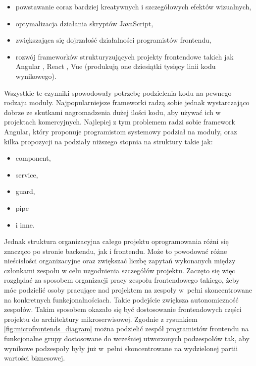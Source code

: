 \documentclass{SGGW-thesis}
\begin{document}
\begin{itemize}
	\item powstawanie coraz bardziej kreatywnych i szczegółowych efektów wizualnych,
	\item optymalizacja działania skryptów JavaScript,
	\item zwiększająca się dojrzałość działalności programistów frontendu,
	\item rozwój frameworków strukturyzujących projekty frontendowe takich jak Angular \cite{angular}, React \cite{react}, Vue \cite{vue} (produkują one dziesiątki tysięcy linii kodu wynikowego).
\end{itemize}

Wszystkie te czynniki spowodowały potrzebę podzielenia kodu na pewnego rodzaju moduły. Najpopularniejsze frameworki radzą sobie jednak wystarczająco dobrze ze skutkami nagromadzenia dużej ilości kodu, aby używać ich w projektach komercyjnych. Najlepiej z tym problemem radzi sobie framework Angular, który proponuje programistom systemowy podział na moduły, oraz kilka propozycji na podziały niższego stopnia na struktury takie jak:

\begin{itemize}
	\item component,
	\item service,
	\item guard,
	\item pipe
	\item i inne.
\end{itemize}

Jednak struktura organizacyjna całego projektu oprogramowania różni się znacząco po stronie backendu, jak i frontendu. Może to powodować różne nieścisłości organizacyjne oraz zwiększać liczbę zapytań wykonanych między członkami zespołu w celu uzgodnienia szczegółów projektu. Zaczęto się więc rozglądać za sposobem organizacji pracy zespołu frontendowego takiego, żeby móc podzielić osoby pracujące nad projektem na zespoły w~pełni skoncentrowane na konkretnych funkcjonalnościach. Takie podejście zwiększa autonomiczność zespołów.
Takim sposobem okazało się być dostosowanie frontendowych części projektu do architektury mikroserwisowej. Zgodnie z rysunkiem \cref{fig:microfrontends_diagram} można podzielić zespół programistów frontendu na funkcjonalne grupy dostosowane do wcześniej utworzonych podzespołów tak, aby wynikowe podzespoły były już w~pełni skoncentrowane na wydzielonej partii wartości biznesowej.
\end{document}
